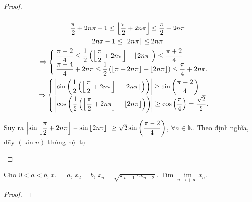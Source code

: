 \documentclass[class=analysis,crop=false]{standalone}
\begin{document}
\begin{proof}
\begin{enumerate}[label = (\roman*)]
\[              \]
              \begin{gather*}
                  \dfrac{\pi}{2} + 2n\pi - 1\le \left\lfloor{\dfrac{\pi}{2} + 2n\pi}\right\rfloor \le \dfrac{\pi}{2} + 2n\pi \\
                  2n\pi - 1\le \left\lfloor{2n\pi}\right\rfloor \le 2n\pi \\
                  \Rightarrow
                  \begin{cases}
                      \dfrac{\pi - 2}{4}\le\dfrac{1}{2}\left(\left\lfloor{\dfrac{\pi}{2} + 2n\pi}\right\rfloor - \left\lfloor{2n\pi}\right\rfloor\right) \le \dfrac{\pi + 2}{4} \\
                      \dfrac{\pi - 4}{4} + 2n\pi\le \dfrac{1}{2}\left(\left\lfloor{\pi + 2n\pi}\right\rfloor + \left\lfloor{2n\pi}\right\rfloor\right) \le \dfrac{\pi}{4} + 2n\pi.
                  \end{cases} \\
                  \Rightarrow
                  \begin{cases}
                      \left\vert{\sin\left(\dfrac{1}{2}\left(\left\lfloor{\dfrac{\pi}{2} + 2n\pi}\right\rfloor - \left\lfloor{2n\pi}\right\rfloor\right)\right)}\right\vert \ge \sin\left(\dfrac{\pi - 2}{4}\right) \\
                      \left\vert{\cos\left(\dfrac{1}{2}\left(\left\lfloor{\dfrac{\pi}{2} + 2n\pi}\right\rfloor - \left\lfloor{2n\pi}\right\rfloor\right)\right)}\right\vert\ge\cos\left(\dfrac{\pi}{4}\right) = \dfrac{\sqrt{2}}{2}.
                  \end{cases}
              \end{gather*}
              \par Suy ra $\left\vert{\sin\left\lfloor{\dfrac{\pi}{2} + 2n\pi}\right\rfloor - \sin\left\lfloor{2n\pi}\right\rfloor}\right\vert\ge \sqrt{2}\sin\left(\dfrac{\pi-2}{4}\right)$, $\forall n\in\mathbb{N}$. Theo định nghĩa, dãy $(\sin n)$ không hội tụ.
    \end{enumerate}
\end{proof}

\begin{exercise}
    Cho $0 < a < b$, $x_{1} = a$, $x_{2} = b$, $x_{n} = \sqrt{x_{n-1}\cdot x_{n-2}}$. Tìm $\lim\limits_{n\to+\infty} x_{n}$.
\end{exercise}

\begin{proof}
\end{proof}
\end{document}
